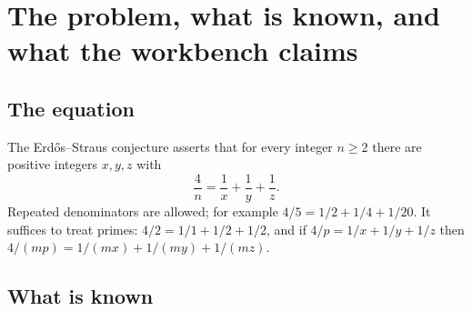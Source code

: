 \section{The problem, what is known, and what the workbench claims}\label{sec:problem}

\subsection{The equation}

The Erdős--Straus conjecture asserts that for every integer $n\ge2$ there are positive integers $x,y,z$ with
\[
\frac4n=\frac1x+\frac1y+\frac1z .
\]
Repeated denominators are allowed; for example $4/5=1/2+1/4+1/20$.
It suffices to treat primes: $4/2=1/1+1/2+1/2$, and if $4/p=1/x+1/y+1/z$ then $4/(mp)=1/(mx)+1/(my)+1/(mz)$.

\subsection{What is known}

